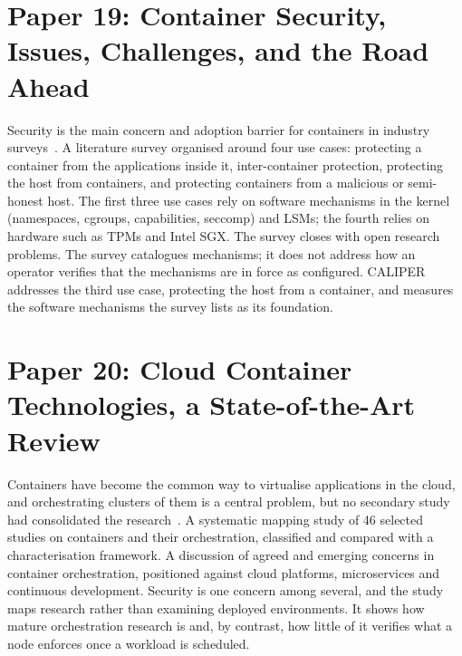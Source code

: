 \section{Paper 19: Container Security, Issues, Challenges, and the Road Ahead}
\label{lit:sultan}

 Security is the main concern and adoption barrier for containers in industry surveys~\cite{sultan2019}.
 A literature survey organised around four use cases: protecting a container from the applications inside it, inter-container protection, protecting the host from containers, and protecting containers from a malicious or semi-honest host.
 The first three use cases rely on software mechanisms in the kernel (namespaces, cgroups, capabilities, seccomp) and LSMs; the fourth relies on hardware such as TPMs and Intel SGX. The survey closes with open research problems.
 The survey catalogues mechanisms; it does not address how an operator verifies that the mechanisms are in force as configured.
 CALIPER addresses the third use case, protecting the host from a container, and measures the software mechanisms the survey lists as its foundation.

\section{Paper 20: Cloud Container Technologies, a State-of-the-Art Review}
\label{lit:pahl}

 Containers have become the common way to virtualise applications in the cloud, and orchestrating clusters of them is a central problem, but no secondary study had consolidated the research~\cite{pahl2019}.
 A systematic mapping study of 46 selected studies on containers and their orchestration, classified and compared with a characterisation framework.
 A discussion of agreed and emerging concerns in container orchestration, positioned against cloud platforms, microservices and continuous development.
 Security is one concern among several, and the study maps research rather than examining deployed environments.
 It shows how mature orchestration research is and, by contrast, how little of it verifies what a node enforces once a workload is scheduled.


